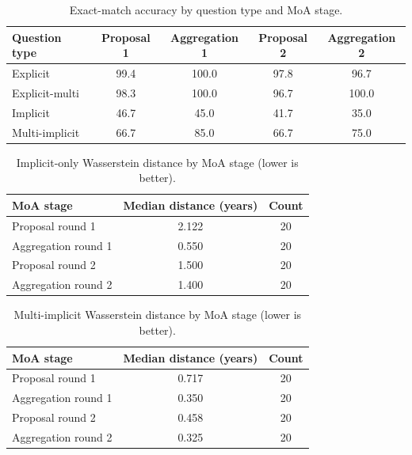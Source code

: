 \begin{table}[t]
    \centering
    \caption{Exact-match accuracy by question type and MoA stage.}
    \label{tab:type-stage-accuracy}
    \begin{tabular}{lcccc}
        \hline
        Question type & Proposal 1 & Aggregation 1 & Proposal 2 & Aggregation 2 \\
        \hline
        Explicit & 99.4 & 100.0 & 97.8 & 96.7 \\
        Explicit-multi & 98.3 & 100.0 & 96.7 & 100.0 \\
        Implicit & 46.7 & 45.0 & 41.7 & 35.0 \\
        Multi-implicit & 66.7 & 85.0 & 66.7 & 75.0 \\
        \hline
    \end{tabular}
\end{table}

\begin{table}[t]
    \centering
    \caption{Implicit-only Wasserstein distance by MoA stage (lower is better).}
    \label{tab:implicit-wasserstein}
    \begin{tabular}{lcc}
        \hline
        MoA stage & Median distance (years) & Count \\
        \hline
        Proposal round 1 & 2.122 & 20 \\
        Aggregation round 1 & 0.550 & 20 \\
        Proposal round 2 & 1.500 & 20 \\
        Aggregation round 2 & 1.400 & 20 \\
        \hline
    \end{tabular}
\end{table}

\begin{table}[t]
    \centering
    \caption{Multi-implicit Wasserstein distance by MoA stage (lower is better).}
    \label{tab:multi-implicit-wasserstein}
    \begin{tabular}{lcc}
        \hline
        MoA stage & Median distance (years) & Count \\
        \hline
        Proposal round 1 & 0.717 & 20 \\
        Aggregation round 1 & 0.350 & 20 \\
        Proposal round 2 & 0.458 & 20 \\
        Aggregation round 2 & 0.325 & 20 \\
        \hline
    \end{tabular}
\end{table}

